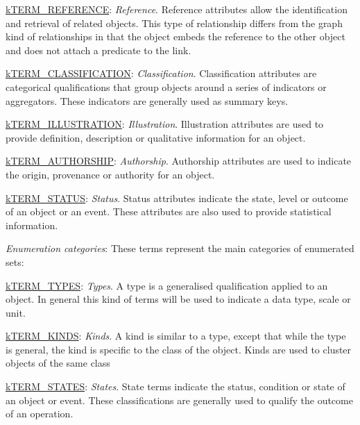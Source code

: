 \begin{DoxyItemize}
\begin{DoxyItemize}
\item {\ttfamily \hyperlink{}{k\-T\-E\-R\-M\-\_\-\-R\-E\-F\-E\-R\-E\-N\-C\-E}}\-: {\itshape Reference}. Reference attributes allow the identification and retrieval of related objects. This type of relationship differs from the graph kind of relationships in that the object embeds the reference to the other object and does not attach a predicate to the link. 
\item {\ttfamily \hyperlink{}{k\-T\-E\-R\-M\-\_\-\-C\-L\-A\-S\-S\-I\-F\-I\-C\-A\-T\-I\-O\-N}}\-: {\itshape Classification}. Classification attributes are categorical qualifications that group objects around a series of indicators or aggregators. These indicators are generally used as summary keys. 
\item {\ttfamily \hyperlink{}{k\-T\-E\-R\-M\-\_\-\-I\-L\-L\-U\-S\-T\-R\-A\-T\-I\-O\-N}}\-: {\itshape Illustration}. Illustration attributes are used to provide definition, description or qualitative information for an object. 
\item {\ttfamily \hyperlink{}{k\-T\-E\-R\-M\-\_\-\-A\-U\-T\-H\-O\-R\-S\-H\-I\-P}}\-: {\itshape Authorship}. Authorship attributes are used to indicate the origin, provenance or authority for an object. 
\item {\ttfamily \hyperlink{}{k\-T\-E\-R\-M\-\_\-\-S\-T\-A\-T\-U\-S}}\-: {\itshape Status}. Status attributes indicate the state, level or outcome of an object or an event. These attributes are also used to provide statistical information. 
\end{DoxyItemize}
\item {\itshape Enumeration categories}\-: These terms represent the main categories of enumerated sets\-: 
\begin{DoxyItemize}
\item {\ttfamily \hyperlink{}{k\-T\-E\-R\-M\-\_\-\-T\-Y\-P\-E\-S}}\-: {\itshape Types}. A type is a generalised qualification applied to an object. In general this kind of terms will be used to indicate a data type, scale or unit. 
\item {\ttfamily \hyperlink{}{k\-T\-E\-R\-M\-\_\-\-K\-I\-N\-D\-S}}\-: {\itshape Kinds}. A kind is similar to a type, except that while the type is general, the kind is specific to the class of the object. Kinds are used to cluster objects of the same class 
\item {\ttfamily \hyperlink{}{k\-T\-E\-R\-M\-\_\-\-S\-T\-A\-T\-E\-S}}\-: {\itshape States}. State terms indicate the status, condition or state of an object or event. These classifications are generally used to qualify the outcome of an operation. 

\end{DoxyItemize}
\end{DoxyItemize}
